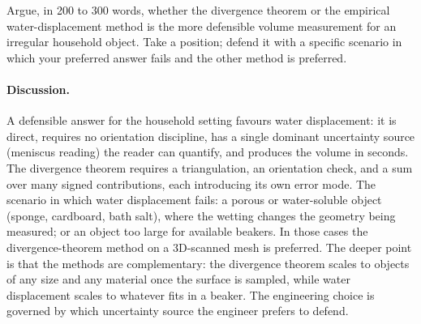 \begin{exercise}
Argue, in 200 to 300 words, whether the divergence theorem or the
empirical water-displacement method is the more defensible volume
measurement for an irregular household object. Take a position;
defend it with a specific scenario in which your preferred answer
fails and the other method is preferred.

\paragraph{Discussion.} A defensible answer for the household
setting favours water displacement: it is direct, requires no
orientation discipline, has a single dominant uncertainty source
(meniscus reading) the reader can quantify, and produces the volume
in seconds. The divergence theorem requires a triangulation, an
orientation check, and a sum over many signed contributions, each
introducing its own error mode. The scenario in which water
displacement fails: a porous or water-soluble object (sponge,
cardboard, bath salt), where the wetting changes the geometry being
measured; or an object too large for available beakers. In those
cases the divergence-theorem method on a 3D-scanned mesh is
preferred. The deeper point is that the methods are complementary:
the divergence theorem scales to objects of any size and any
material once the surface is sampled, while water displacement
scales to whatever fits in a beaker. The engineering choice is
governed by which uncertainty source the engineer prefers to
defend.
\end{exercise}

